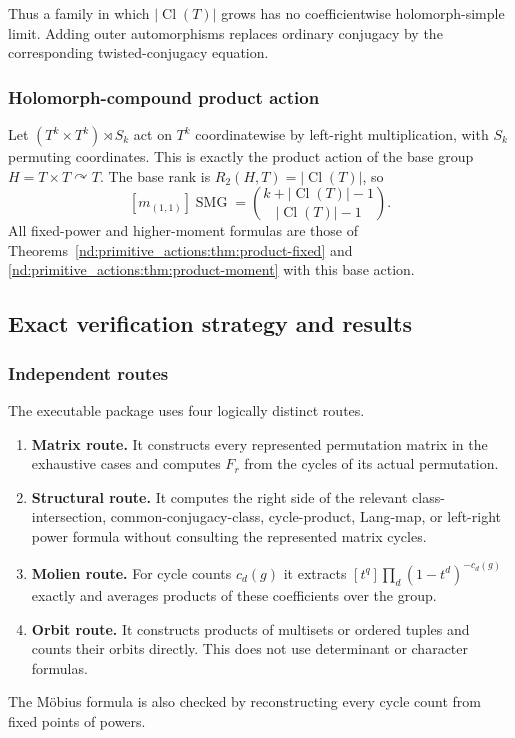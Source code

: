 \documentclass[10pt]{article}
\newcommand{\SMG}{\operatorname{SMG}}
\newcommand{\MGF}{\SMG}
\newcommand{\Cl}{\operatorname{Cl}}
\begin{document}
Thus a family in which $|\Cl(T)|$ grows has no coefficientwise
holomorph-simple limit.  Adding outer automorphisms replaces ordinary
conjugacy by the corresponding twisted-conjugacy equation.

\subsubsection{Holomorph-compound product action}

Let $(T^k\times T^k)\rtimes S_k$ act on $T^k$ coordinatewise by left-right
multiplication, with $S_k$ permuting coordinates.  This is exactly the
product action of the base group $H=T\times T\curvearrowright T$.  The
base rank is $R_2(H,T)=|\Cl(T)|$, so
\begin{equation}\label{nd:primitive_actions:eq:hc-pair}
 \boxed{[m_{(1,1)}]\MGF=
 \binom{k+|\Cl(T)|-1}{|\Cl(T)|-1}.}
\end{equation}
All fixed-power and higher-moment formulas are those of
Theorems~\ref{nd:primitive_actions:thm:product-fixed} and \ref{nd:primitive_actions:thm:product-moment} with this base
action.

\subsection{Exact verification strategy and results}

\subsubsection{Independent routes}

The executable package uses four logically distinct routes.
\begin{enumerate}
\item \textbf{Matrix route.}  It constructs every represented permutation
matrix in the exhaustive cases and computes $F_r$ from the cycles of its
actual permutation.
\item \textbf{Structural route.}  It computes the right side of the relevant
class-intersection, common-conjugacy-class, cycle-product, Lang-map, or
left-right power formula without consulting the represented matrix cycles.
\item \textbf{Molien route.}  For cycle counts $c_d(g)$ it extracts
$[t^q]\prod_d(1-t^d)^{-c_d(g)}$ exactly and averages products of these
coefficients over the group.
\item \textbf{Orbit route.}  It constructs products of multisets or ordered
tuples and counts their orbits directly.  This does not use determinant or
character formulas.
\end{enumerate}
The M\"obius formula is also checked by reconstructing every cycle count from
fixed points of powers.
\end{document}
